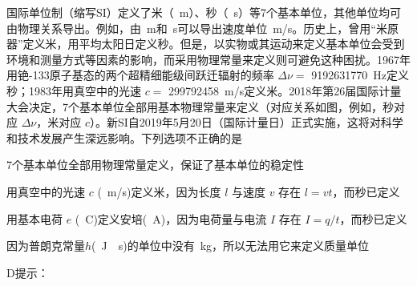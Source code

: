 国际单位制（缩写SI）定义了米（\qty{}{m}）、秒（\qty{}{s}）等7个基本单位，其他单位均可由物理关系导出。例如，由\qty{}{m}和\qty{}{s}可以导出速度单位\qty{}{m/s}。历史上，曾用“米原器”定义米，用平均太阳日定义秒。但是，以实物或其运动来定义基本单位会受到环境和测量方式等因素的影响，而采用物理常量来定义则可避免这种困扰。1967年用铯-133原子基态的两个超精细能级间跃迁辐射的频率 \(\Delta \nu = \) \qty{9192631770}{Hz}定义秒；1983年用真空中的光速 \(c = \) \qty{299792458}{m/s}定义米。2018年第26届国际计量大会决定，7个基本单位全部用基本物理常量来定义（对应关系如图，例如，秒对应 \(\Delta \nu\)，米对应 \(c\)）。新SI自2019年5月20日（国际计量日）正式实施，这将对科学和技术发展产生深远影响。下列选项不正确的是\paren[]

\begin{choices}
	\item 7个基本单位全部用物理常量定义，保证了基本单位的稳定性
	\item 用真空中的光速 \(c\) (\qty{}{m/s})定义米，因为长度 \(l\) 与速度 \(v\) 存在 \(l = vt\)，而秒已定义
	\item 用基本电荷 \(e\) (\qty{}{C})定义安培(\qty{}{A})，因为电荷量与电流 \(I\) 存在 \(I = q/t\)，而秒已定义
	\item 因为普朗克常量\(h\)(\qty{}{J\cdot s})的单位中没有\qty{}{kg}，所以无法用它来定义质量单位
\end{choices}
\begin{answer}
    D\qquad 提示：
\end{answer}